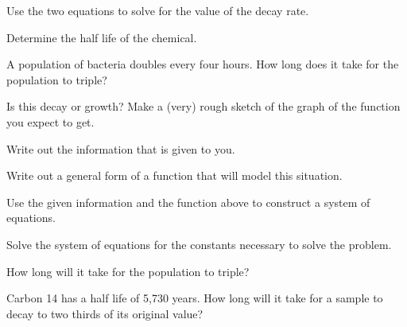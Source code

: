 \begin{problem}
\begin{subproblem}
\begin{subsubproblem}
    \item Use the two equations to solve for the value of the decay rate.
      \vfill
      \vfill

    \item Determine the half life of the chemical.
      \vfill
    \end{subsubproblem}

    
  \end{subproblem}

\clearpage

\item A population of bacteria doubles every four hours. How long does
  it take for the population to triple?
  \begin{subproblem}
  \item Is this decay or growth? Make a (very) rough sketch of the
    graph of the function you expect to get.
    \vspace{3em}
  \item Write out the information that is given to you.
    \vspace{3em}
  \item Write out a general form of a function that will model this
    situation.
    \vspace{1em}
  \item Use the given information and the function above to construct
    a system of equations.
    \vspace{2em}
  \item Solve the system of equations for the constants necessary to
    solve the problem.
    \vfill
  \item How long will it take for the population to triple?
    \vfill
  \end{subproblem}

\clearpage

\item Carbon 14 has a half life of 5,730 years. How long will it take
  for a sample to decay to two thirds of its original value?
  \vfill
\clearpage



\end{problem}

\postClass

